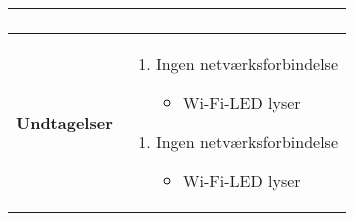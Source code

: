 \begin{center}
\begin{longtable}{|p{5cm}|p{9cm}|}
\begin{enumerate}
			\end{enumerate}
		\\\hline
		\textbf{Undtagelser}
			&\begin{enumerate}[label=\ref{kravspec:uc4_opdaterweb}.a]
			\item Ingen netværksforbindelse
					\begin{itemize}				
						\item Wi-Fi-LED lyser
					\end{itemize}
			\end{enumerate}
			\begin{enumerate}[label=\ref{kravspec:uc4_emailafsend}.a]
			\item Ingen netværksforbindelse
					\begin{itemize}				
						\item Wi-Fi-LED lyser
					\end{itemize}
			\end{enumerate}
		\\\hline
	\end{longtable} 
\end{center}

